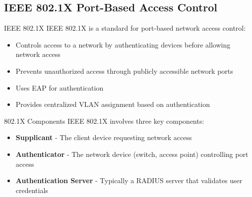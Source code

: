\subsection{IEEE 802.1X Port-Based Access Control}

\begin{definition}{IEEE 802.1X}
IEEE 802.1X is a standard for port-based network access control:
\begin{itemize}
    \item Controls access to a network by authenticating devices before allowing network access
    \item Prevents unauthorized access through publicly accessible network ports
    \item Uses EAP for authentication
    \item Provides centralized VLAN assignment based on authentication
\end{itemize}
\end{definition}

\begin{concept}{802.1X Components}
IEEE 802.1X involves three key components:
\begin{itemize}
    \item \textbf{Supplicant} - The client device requesting network access
    \item \textbf{Authenticator} - The network device (switch, access point) controlling port access
    \item \textbf{Authentication Server} - Typically a RADIUS server that validates user credentials
\end{itemize}
\end{concept}

